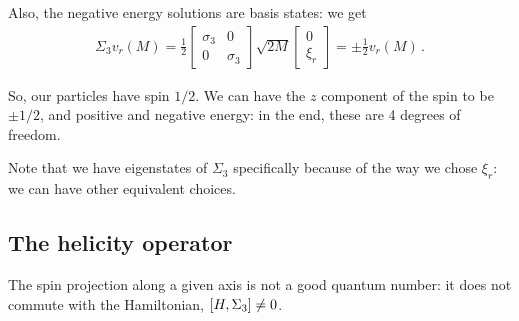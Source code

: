 \documentclass[main.tex]{subfiles}
\begin{document}
Also, the negative energy solutions are basis states: we get 
%
\begin{subequations}
\begin{align}
\Sigma_{3} v_r (M) = \frac{1}{2}
\left[\begin{array}{cc}
\sigma_3  & 0 \\ 
0 & \sigma_3 
\end{array}\right]
\sqrt{2M}
\left[\begin{array}{c}
0   \\
\xi_{r} 
\end{array}\right]
= \pm \frac{1}{2} v_r(M)
\,.
\end{align}
\end{subequations}

So, our particles have spin \(1/2\). We can have the \(z\) component of the spin to be \(\pm 1 /2 \), and positive and negative energy: in the end, these are 4 degrees of freedom. 

Note that we have eigenstates of \(\Sigma_3 \) specifically because of the way we chose \(\xi_{r}\): we can have other equivalent choices. 

\subsection{The helicity operator}

\begin{claim}
The spin projection along a given axis is not a good quantum number: it does not commute with the Hamiltonian, \(\qty[H , \Sigma_3 ] \neq 0\).
\end{claim}
\end{document}
